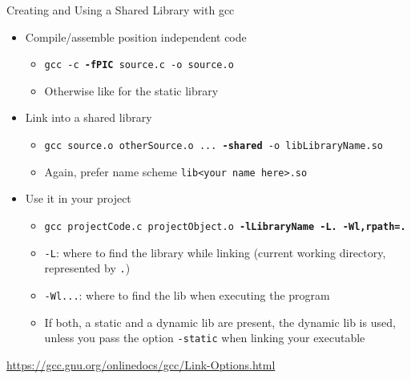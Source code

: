 \begin{frame}{Creating and Using a Shared Library with gcc}
%
\begin{itemize}
\item Compile/assemble position independent code
	\begin{itemize}
	\item \texttt{gcc -c \textbf{-fPIC} source.c -o source.o}
	\item Otherwise like for the static library
	\end{itemize}
\item Link into a shared library
	\begin{itemize}
	\item \texttt{gcc source.o otherSource.o ... \textbf{-shared} -o libLibraryName.so}
	\item Again, prefer name scheme \texttt{lib<your name here>.so}
	\end{itemize}
\item Use it in your project
	\begin{itemize}
	\item \texttt{gcc projectCode.c projectObject.o \textbf{-lLibraryName -L. -Wl,rpath=.}}
	\item \texttt{-L}: where to find the library while linking (current working directory, represented by \texttt{.})
	\item \texttt{-Wl...}: where to find the lib when executing the program
	\item If both, a static and a dynamic lib are present, the dynamic lib is used, unless you pass the option \texttt{-static} when linking your executable
	\end{itemize}
\end{itemize}
%
\begin{hintbox}

\url{https://gcc.gnu.org/onlinedocs/gcc/Link-Options.html}
\end{hintbox}
%
\end{frame}


